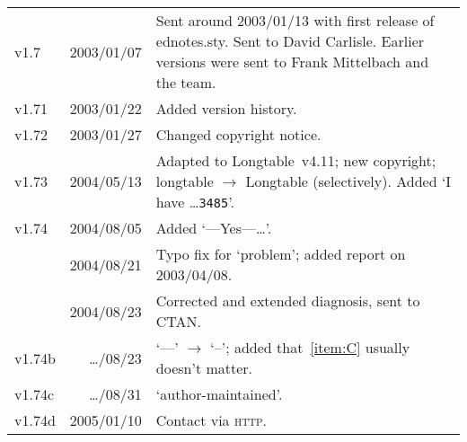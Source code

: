 \documentclass[DIV=9, parskip=half, pagesize=auto]{scrartcl}
\newcommand*{\pkg}[1]{\textsf{#1}}
\begin{document}
\begin{tabular}{@{}lr>{\raggedright\arraybackslash}p{93mm}@{}}
  v1.7   & 2003/01/07   & Sent around 2003/01/13 with first release of \pkg{ednotes.sty}. Sent to David Carlisle. Earlier versions were sent to Frank Mittelbach and the team. \\
  v1.71  & 2003/01/22   & Added version history.                                                                                                                               \\
  v1.72  & 2003/01/27   & Changed copyright notice.                                                                                                                            \\
  v1.73  & 2004/05/13   & Adapted to \pkg{Longtable}~v4.11; new copyright; \pkg{longtable} $\to$ \pkg{Longtable} (selectively). Added `I have \ldots \texttt{3485}'.                                      \\
  v1.74  & 2004/08/05   & Added `---Yes---\ldots'.                                                                                                                             \\
         & 2004/08/21   & Typo fix for `problem'; added report on 2003/04/08.                                                                                                  \\
         & 2004/08/23   & Corrected and extended diagnosis, sent to CTAN.                                                                                                      \\
  v1.74b & \ldots/08/23 & `---' $\to$ `--'; added that~\ref{item:C} usually doesn't matter.                                                                                    \\
  v1.74c & \ldots/08/31 & `author-maintained'.                                                                                                                                 \\
  v1.74d & 2005/01/10   & Contact via \textsc{http}.
\end{tabular}
\end{document}
